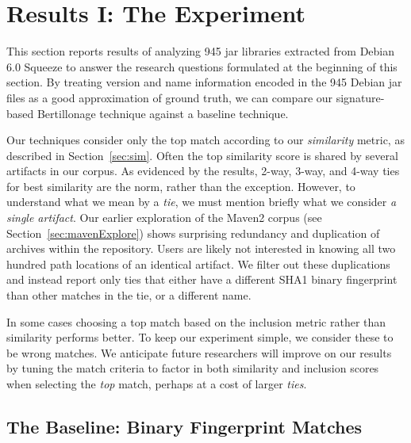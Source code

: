 \section{Results I:  The Experiment}

\label{sec:results}

This section reports results of analyzing 945 jar libraries extracted from
Debian 6.0 Squeeze to answer the research questions formulated
at the beginning of this section.
By treating version and name information encoded
in the 945 Debian jar files as a good approximation of ground truth, we can
compare our signature-based Bertillonage technique against a baseline
technique.

Our techniques consider only the top match according to our
\emph{similarity} metric, as described in Section~\ref{sec:sim}.  Often the
top similarity score is shared by several artifacts in our corpus.  As
evidenced by the results, 2-way, 3-way, and 4-way ties for best similarity are the
norm, rather than the exception.  However, to understand what we mean by a
\emph{tie}, we must mention briefly what we consider \emph{a single
artifact}.  Our earlier exploration of the Maven2 corpus (see
Section~\ref{sec:mavenExplore}) shows surprising redundancy and duplication
of archives within the repository.  Users are likely not interested in knowing all two hundred
path locations of an identical artifact.  We filter out these duplications
and instead report only ties that either have a different SHA1 binary
fingerprint than other matches in the tie, or a different name.

In some cases choosing a top match based on the inclusion metric rather
than similarity performs better.  To keep our experiment simple, we
consider these to be wrong matches.  We anticipate future researchers
will improve on our results by tuning the match criteria to factor in
both similarity and inclusion scores when selecting the \emph{top} match,
perhaps at a cost of larger \emph{ties}.


\subsection{The Baseline:  Binary Fingerprint Matches}

